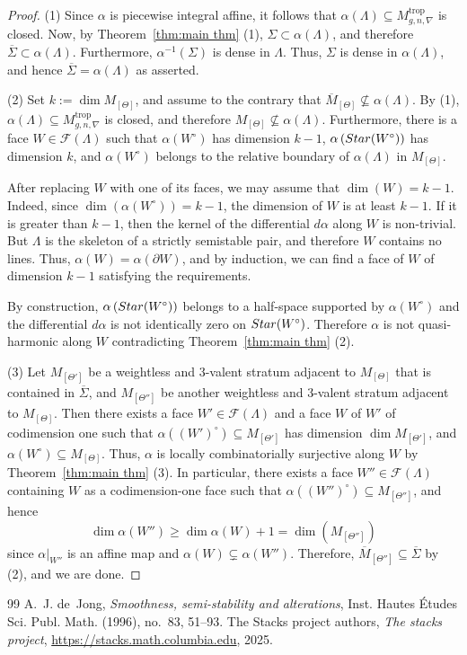 \documentclass[10pt,a4paper]{amsart}
\newcommand{\CF}{{\mathcal F}}
\newcommand{\Star}{{\rm Star}}
\newcommand{\trop}{\mathrm{trop}}
\begin{document}
\begin{proof}
(1) Since $\alpha$ is piecewise integral affine, it follows that $\alpha(\Lambda)\subseteq M^{\trop}_{g,n,\nabla}$ is closed. Now, by Theorem~\ref{thm:main thm} (1), $\Sigma\subset \alpha(\Lambda)$, and therefore $\overline\Sigma\subset \alpha(\Lambda)$. Furthermore, $\alpha^{-1}(\Sigma)$ is dense in $\Lambda$. Thus, $\Sigma$ is dense in $\alpha(\Lambda)$, and hence $\overline\Sigma=\alpha(\Lambda)$ as asserted.

(2) Set $k:=\dim M_{[\Theta]}$, and assume to the contrary that $\overline M_{[\Theta]}\nsubseteq \alpha(\Lambda)$. By (1), $\alpha(\Lambda)\subseteq M^{\trop}_{g,n,\nabla}$ is closed, and therefore $M_{[\Theta]}\nsubseteq \alpha(\Lambda)$. Furthermore, there is a face $W\in \CF(\Lambda)$ such that $\alpha(W^\circ)$ has dimension $k-1$, $\alpha\left(\Star(W^\circ)\right)$ has dimension $k$, and $\alpha(W^\circ)$ belongs to the relative boundary of $\alpha(\Lambda)$ in $M_{[\Theta]}$.

After replacing $W$ with one of its faces, we may assume that $\dim(W)=k-1$. Indeed, since $\dim(\alpha(W^\circ))=k-1$, the dimension of $W$ is at least $k-1$. If it is greater than $k-1$, then the kernel of the differential $d\alpha$ along $W$ is non-trivial. But $\Lambda$ is the skeleton of a strictly semistable pair, and therefore $W$ contains no lines. Thus, $\alpha(W)=\alpha(\partial W)$, and by induction, we can find a face of $W$ of dimension $k-1$ satisfying the requirements.

By construction, $\alpha\left(\Star(W^\circ)\right)$ belongs to a half-space supported by $\alpha(W^\circ)$ and the differential $d\alpha$ is not identically zero on $\Star(W^\circ)$. Therefore $\alpha$ is not quasi-harmonic along $W$ contradicting Theorem~\ref{thm:main thm} (2).

(3) Let $M_{[\Theta']}$ be a weightless and $3$-valent stratum adjacent to $M_{[\Theta]}$ that is contained in $\overline\Sigma$, and $M_{[\Theta'']}$ be another weightless and $3$-valent stratum adjacent to $M_{[\Theta]}$. Then there exists a face $W'\in\mathcal F(\Lambda)$ and a face $W$ of $W'$ of codimension one such that $\alpha\left((W')^\circ\right)\subseteq M_{[\Theta']}$ has dimension $\dim M_{[\Theta']}$, and $\alpha(W^\circ)\subseteq M_{[\Theta]}$. Thus, $\alpha$ is locally combinatorially surjective along $W$ by Theorem~\ref{thm:main thm} (3). In particular, there exists a face $W''\in\mathcal F(\Lambda)$ containing $W$ as a codimension-one face such that $\alpha\left((W'')^\circ\right)\subseteq M_{[\Theta'']}$, and hence 
$$\dim \alpha\left(W''\right) \ge \dim \alpha(W)+1=\dim\left(M_{[\Theta'']}\right)$$
since $\alpha|_{W''}$ is an affine map and $\alpha(W)\subsetneq\alpha(W'')$.
Therefore, $\overline M_{[\Theta'']}\subseteq \overline{\Sigma}$ by (2), and we are done.
\end{proof}

\begin{thebibliography}{99}
 A.~J. de~Jong, \emph{Smoothness, semi-stability and alterations}, Inst. Hautes \'{E}tudes Sci. Publ. Math. (1996), no.~83, 51--93. 
 The {Stacks project authors}, \emph{The stacks project}, \url{https://stacks.math.columbia.edu}, 2025.
\end{thebibliography}
\end{document}
